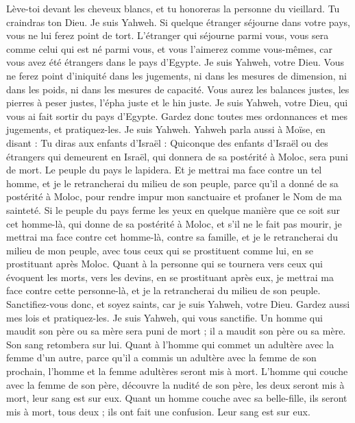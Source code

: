 \begin{multicols}{2}
Lève-toi devant les cheveux blancs, et tu honoreras la personne du vieillard. Tu craindras ton Dieu. Je suis Yahweh.
Si quelque étranger séjourne dans votre pays, vous ne lui ferez point de tort.
L'étranger qui séjourne parmi vous, vous sera comme celui qui est né parmi vous, et vous l'aimerez comme vous-mêmes, car vous avez été étrangers dans le pays d'Egypte. Je suis Yahweh, votre Dieu.
Vous ne ferez point d'iniquité dans les jugements, ni dans les mesures de dimension, ni dans les poids, ni dans les mesures de capacité.
Vous aurez les balances justes, les pierres à peser justes, l'épha juste et le hin juste. Je suis Yahweh, votre Dieu, qui vous ai fait sortir du pays d'Egypte.
Gardez donc toutes mes ordonnances et mes jugements, et pratiquez-les. Je suis Yahweh.
\VerseOne{}Yahweh parla aussi à Moïse, en disant :
Tu diras aux enfants d'Israël : Quiconque des enfants d'Israël ou des étrangers qui demeurent en Israël, qui donnera de sa postérité à Moloc, sera puni de mort. Le peuple du pays le lapidera.
Et je mettrai ma face contre un tel homme, et je le retrancherai du milieu de son peuple, parce qu'il a donné de sa postérité à Moloc, pour rendre impur mon sanctuaire et profaner le Nom de ma sainteté.
Si le peuple du pays ferme les yeux en quelque manière que ce soit sur cet homme-là, qui donne de sa postérité à Moloc, et s'il ne le fait pas mourir,
je mettrai ma face contre cet homme-là, contre sa famille, et je le retrancherai du milieu de mon peuple, avec tous ceux qui se prostituent comme lui, en se prostituant après Moloc.
Quant à la personne qui se tournera vers ceux qui évoquent les morts, vers les devins, en se prostituant après eux, je mettrai ma face contre cette personne-là, et je la retrancherai du milieu de son peuple.
Sanctifiez-vous donc, et soyez saints, car je suis Yahweh, votre Dieu.
Gardez aussi mes lois et pratiquez-les. Je suis Yahweh, qui vous sanctifie.
Un homme qui maudit son père ou sa mère sera puni de mort ; il a maudit son père ou sa mère. Son sang retombera sur lui.
Quant à l'homme qui commet un adultère avec la femme d'un autre, parce qu'il a commis un adultère avec la femme de son prochain, l'homme et la femme adultères seront mis à mort.
L'homme qui couche avec la femme de son père, découvre la nudité de son père, les deux seront mis à mort, leur sang est sur eux.
Quant un homme couche avec sa belle-fille, ils seront mis à mort, tous deux ; ils ont fait une confusion. Leur sang est sur eux.

\end{multicols}
